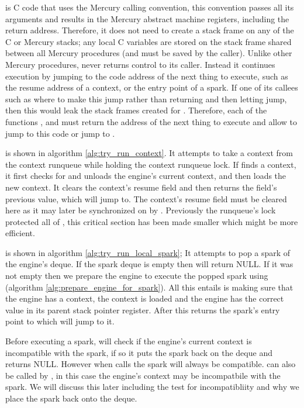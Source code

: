 \idle is C code that uses the Mercury calling convention,
this convention passes all its arguments and results in the Mercury abstract
machine registers, including the return address.
Therefore, it does not need to create a stack frame on any of the C or
Mercury stacks;
any local C variables are stored on the stack frame shared between all
Mercury procedures (and must be saved by the caller).
Unlike other Mercury procedures, \idle never returns control to its caller.
Instead it continues execution by jumping to the code address of the next
thing to execute,
such as the resume address of a context,
or the entry point of a spark.
If one of its callees such as \trystealspark where to make this jump rather
than returning and then letting \idle jump,
then this would leak the stack frames created for \trystealspark.
Therefore, each of the functions \tryrunlocalspark, \tryruncontext and
\trystealspark must return the address of the next thing to execute and
allow \idle to jump to this code or jump to \sleep.

\tryruncontext is shown in algorithm \ref{alg:try_run_context}.
It attempts to take a context from the context runqueue while holding the
context runqueue lock.
If \tryruncontext finds a context,
it first checks for and unloads the engine's current context,
and then loads the new context.
It clears the context's resume field and then returns the field's previous
value, which \idle will jump to.
The context's resume field must be cleared here as it may later be
synchronized on by \joinandcontinue.
Previously the runqueue's lock protected all of \idle,
this critical section has been made smaller which might be more efficient.

\tryrunlocalspark is shown in algorithm \ref{alg:try_run_local_spark};
It attempts to pop a spark of the engine's deque.
If the spark deque is empty then \tryrunlocalspark
will return NULL.
If it was not empty then
we prepare the engine to execute the popped spark using
\prepareengineforspark
(algorithm \ref{alg:prepare_engine_for_spark}).
All this entails is making sure that the engine has a context,
the context is loaded and
the engine has the correct value in its parent stack pointer register.
After this \tryrunlocalspark returns the spark's entry point to \idle which
will jump to it.

Before executing a spark,
\tryrunlocalspark
will check if the engine's current context is incompatible with the spark,
if so it puts the spark back on the deque and returns NULL.
However when \idle calls \tryrunlocalspark the spark will always be
compatible.
\tryrunlocalspark can also be called by \joinandcontinue,
in this case the engine's context may be incompatbile with the spark.
We will discuss this later including the test for incompatibliity and why we
place the spark back onto the deque.

